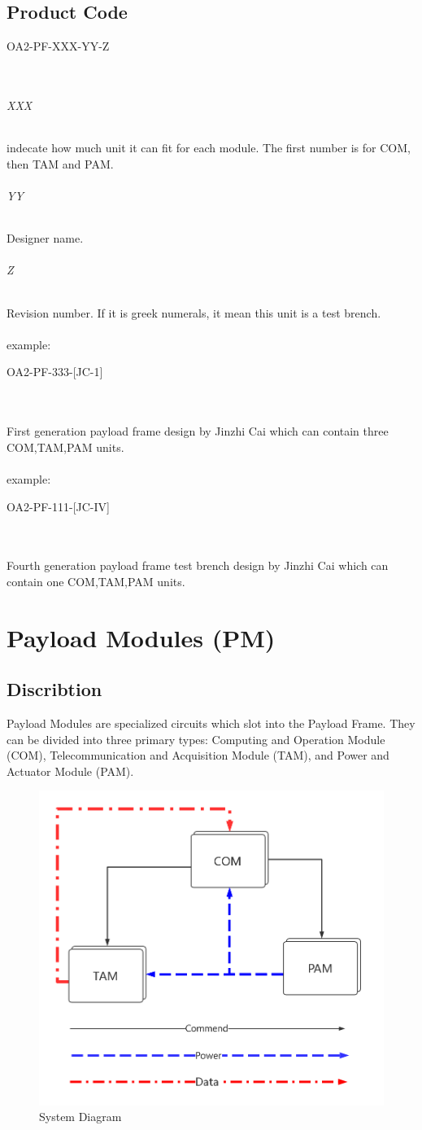 \documentclass[12pt,article]{memoir}
\begin{document}
\section{Product Code}
\begin{LARGE}
OA2-PF-XXX-YY-Z
\end{LARGE}\\
\subparagraph{XXX}
indecate how much unit it can fit for each module. The first number is for COM, then TAM and PAM.
\subparagraph{YY}
Designer name.
\subparagraph{Z}
Revision number. If it is greek numerals, it mean this unit is a test brench.
\\\\
example: 
\begin{large}
OA2-PF-333-[JC-1]
\end{large}\\\\
First generation payload frame design by Jinzhi Cai which can contain three COM,TAM,PAM units.\\\\
example: 
\begin{large}
OA2-PF-111-[JC-IV]
\end{large}\\\\
Fourth generation payload frame test brench design by Jinzhi Cai which can contain one COM,TAM,PAM units.
\newpage
\chapter{Payload Modules (PM)}
\section{Discribtion}
Payload Modules are specialized circuits which slot into the Payload Frame. They can be divided into three primary types: Computing and Operation Module (COM), Telecommunication and Acquisition Module (TAM), and Power and Actuator Module (PAM).
\begin{figure}[htp]
\includegraphics[width=\textwidth]{img/ES00003_Globaldia.png}
 \caption{System Diagram}	
\end{figure}
\clearpage
\end{document}
